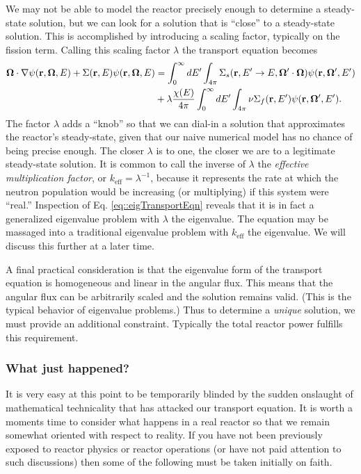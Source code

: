 \documentclass[11pt]{article}
\renewcommand\vec{\mathbf}
\begin{document}
We may not be able to model the reactor precisely enough to determine a steady-state solution, but we can look for a solution that is ``close'' to a steady-state solution.  This is accomplished by introducing a scaling factor, typically on the fission term.  Calling this scaling factor \(\lambda\) the transport equation becomes
\begin{align}
  \vec{\Omega} \cdot \nabla\psi(\vec{r},\vec{\Omega},E)
  + \Sigma(\vec{r},E) \psi(\vec{r},\vec{\Omega},E)
  &= \int_0^\infty dE' \int_{4\pi} \Sigma_s(\vec{r},E' \rightarrow E, \vec{\Omega}'\cdot\vec{\Omega}) \psi(\vec{r},\vec{\Omega}',E') \notag\\
  &+ \lambda\frac{\chi(E)}{4\pi} \int_0^\infty dE' \int_{4\pi} \nu\Sigma_f(\vec{r},E') \psi(\vec{r},\vec{\Omega}',E').
  \label{eq::eigTransportEqn}
\end{align}
The factor \(\lambda\) adds a ``knob'' so that we can dial-in a solution that approximates the reactor's steady-state, given that our naive numerical model has no chance of being precise enough.  The closer \(\lambda\) is to one, the closer we are to a legitimate steady-state solution.  It is common to call the inverse of \(\lambda\) the \emph{effective multiplication factor}, or \(k_\text{eff} = \lambda^{-1}\), because it represents the rate at which the neutron population would be increasing (or multiplying) if this system were ``real.''  Inspection of Eq. \eqref{eq::eigTransportEqn} reveals that it is in fact a generalized eigenvalue problem with \(\lambda\) the eigenvalue.  The equation may be massaged into a traditional eigenvalue problem with \(k_\text{eff}\) the eigenvalue.  We will discuss this further at a later time.

A final practical consideration is that the eigenvalue form of the transport equation is homogeneous and linear in the angular flux.  This means that the angular flux can be arbitrarily scaled and the solution remains valid.  (This is the typical behavior of eigenvalue problems.)  Thus to determine a \emph{unique} solution, we must provide an additional constraint.  Typically the total reactor power fulfills this requirement.

\subsubsection{What just happened?}
\label{sec:orgheadline51}
It is very easy at this point to be temporarily blinded by the sudden onslaught of mathematical technicality that has attacked our transport equation.  It is worth a moments time to consider what happens in a real reactor so that we remain somewhat oriented with respect to reality.  If you have not been previously exposed to reactor physics or reactor operations (or have not paid attention to such discussions) then some of the following must be taken initially on faith.
\end{document}
